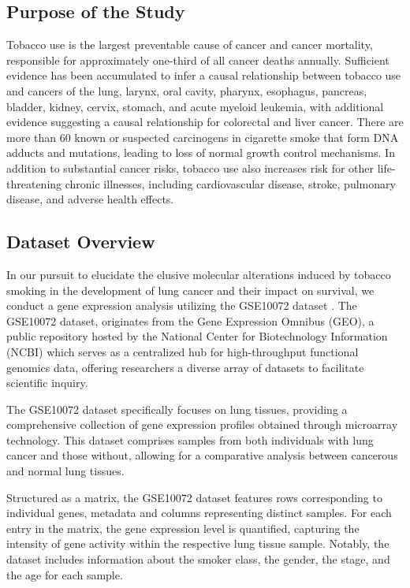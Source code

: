 \documentclass[
	a4paper, %
	10pt, %
	unnumberedsections, %
	twoside, %
]{LTJournalArticle}
\begin{document}
\subsection{Purpose of the Study}
Tobacco use is the largest preventable cause of cancer and cancer mortality, responsible for approximately one-third of all cancer deaths annually. Sufficient evidence has been accumulated to infer a causal relationship between tobacco use and cancers of the lung, larynx, oral cavity, pharynx, esophagus, pancreas, bladder, kidney, cervix, stomach, and acute myeloid leukemia, with additional evidence suggesting a causal relationship for colorectal and liver cancer. There are more than 60 known or suspected carcinogens in cigarette smoke that form DNA adducts and mutations, leading to loss of normal growth control mechanisms. In addition to substantial cancer risks, tobacco use also increases risk for other life-threatening chronic illnesses, including cardiovascular disease, stroke, pulmonary disease, and adverse health effects.


\subsection{Dataset Overview}
In our pursuit to elucidate the elusive molecular alterations induced by tobacco smoking in the development of lung cancer and their impact on survival, we conduct a gene expression analysis utilizing the GSE10072 dataset \cite{GSE10072}. The GSE10072 dataset, originates from the Gene Expression Omnibus (GEO), a public repository hosted by the National Center for Biotechnology Information (NCBI) which serves as a centralized hub for high-throughput functional genomics data, offering researchers a diverse array of datasets to facilitate scientific inquiry. 

The GSE10072 dataset specifically focuses on lung tissues, providing a comprehensive collection of gene expression profiles obtained through microarray technology. This dataset comprises samples from both individuals with lung cancer and those without, allowing for a comparative analysis between cancerous and normal lung tissues. 

Structured as a matrix, the GSE10072 dataset features rows corresponding to individual genes, metadata and columns representing distinct samples. For each entry in the matrix, the gene expression level is quantified, capturing the intensity of gene activity within the respective lung tissue sample. Notably, the dataset includes information about the smoker class, the gender, the stage, and the age for each sample.
\end{document}
